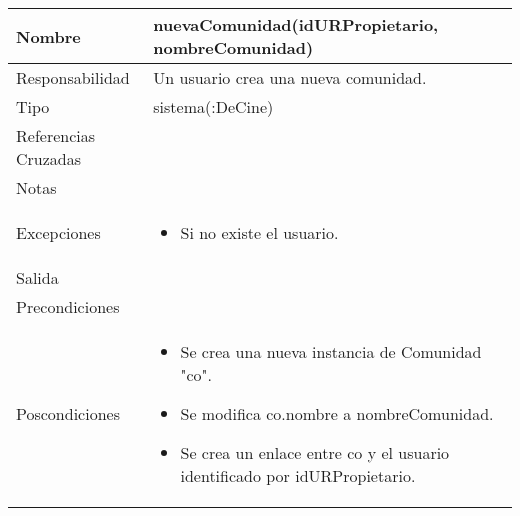 \documentclass{article}
\begin{document}
\begin{table}[h]
\begin{tabular}{|l|l|l|l|l|l|}
\hline
\multicolumn{2}{|p{3cm}|}{Nombre} & \multicolumn{3}{p{10cm}|}{\textbf{nuevaComunidad(idURPropietario, nombreComunidad)}}\\
\hline
\multicolumn{2}{|p{3cm}|}{Responsabilidad} & \multicolumn{4}{p{10cm}|}{Un usuario crea una nueva comunidad.} \\
\hline
\multicolumn{2}{|p{3cm}|}{Tipo} & \multicolumn{4}{p{10cm}|}{sistema(:DeCine)} \\
\hline
\multicolumn{2}{|p{3cm}|}{Referencias Cruzadas} & \multicolumn{4}{p{10cm}|}{} \\
\hline
\multicolumn{2}{|p{3cm}|}{Notas} & \multicolumn{4}{p{10cm}|}{} \\
\hline
\multicolumn{2}{|p{3cm}|}{Excepciones} & \multicolumn{4}{p{10cm}|}{\begin{itemize}
\item Si no existe el usuario.
\end{itemize}} \\
\hline
\multicolumn{2}{|p{3cm}|}{Salida} & \multicolumn{4}{p{10cm}|}{} \\
\hline
\multicolumn{2}{|p{3cm}|}{Precondiciones} & \multicolumn{4}{p{10cm}|}{} \\
\hline
\multicolumn{2}{|p{3cm}|}{Poscondiciones} & \multicolumn{4}{p{10cm}|}{\begin{itemize}
\item Se crea una nueva instancia de Comunidad "co".
\item Se modifica co.nombre a nombreComunidad.
\item Se crea un enlace entre co y el usuario identificado por idURPropietario.
\end{itemize}}\\
\hline
\end{tabular}
\end{table}
\end{document}
